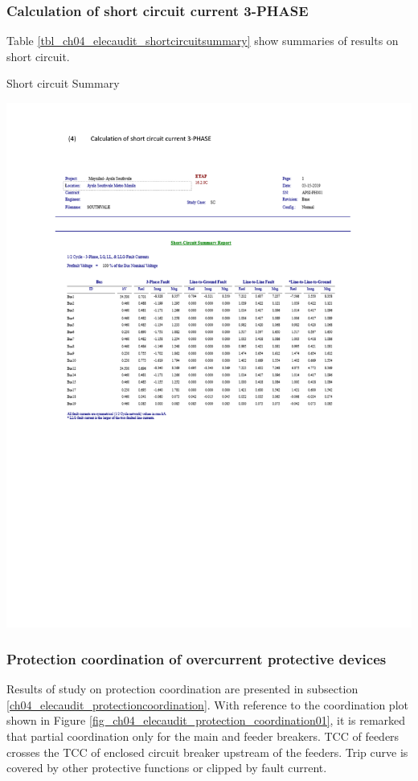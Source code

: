 \subsubsection{Calculation of short circuit current 3-PHASE}
Table \ref{tbl_ch04_elecaudit_shortcircuitsummary} show summaries of results on short circuit.


\begin{table}
	\caption{Short circuit Summary}
	\label{tbl_ch04_elecaudit_shortcircuitsummary}
	\includegraphics[width=\textwidth]{tables/tbl_ch04_elecaudit_shortcircuitsummary} \\	
	
\end{table}


\subsubsection{Protection coordination of overcurrent protective devices}
Results of study on protection coordination are presented in subsection \ref{ch04_elecaudit_protectioncoordination}. With reference to the coordination plot shown in Figure \ref{fig_ch04_elecaudit_protection_coordination01}, it is remarked that partial coordination only for the main and feeder breakers. TCC of feeders crosses the TCC of enclosed circuit breaker upstream of the feeders. Trip curve is covered by other protective functions or clipped by fault current.

